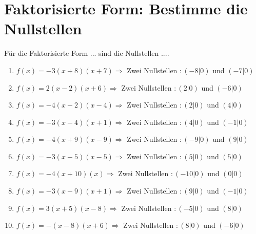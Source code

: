 \documentclass{article}%
\begin{document}
\section{Faktorisierte Form: Bestimme die Nullstellen}%
\label{sec:FaktorisierteFormBestimmedieNullstellen}%
Für die Faktorisierte Form ... sind die Nullstellen ....%
\begin{enumerate}[label=\alph*)]%
\item%
\newline\vspace{0.5cm}$f(x)=-3(x+8)(x+7) \Rightarrow $ Zwei Nullstellen $: (-8|0) $ und $ (-7|0) $%
\item%
\newline\vspace{0.5cm}$f(x)=2(x-2)(x+6) \Rightarrow $ Zwei Nullstellen $: (2|0) $ und $ (-6|0) $%
\item%
\newline\vspace{0.5cm}$f(x)=-4(x-2)(x-4) \Rightarrow $ Zwei Nullstellen $: (2|0) $ und $ (4|0) $%
\item%
\newline\vspace{0.5cm}$f(x)=-3(x-4)(x+1) \Rightarrow $ Zwei Nullstellen $: (4|0) $ und $ (-1|0) $%
\item%
\newline\vspace{0.5cm}$f(x)=-4(x+9)(x-9) \Rightarrow $ Zwei Nullstellen $: (-9|0) $ und $ (9|0) $%
\item%
\newline\vspace{0.5cm}$f(x)=-3(x-5)(x-5) \Rightarrow $ Zwei Nullstellen $: (5|0) $ und $ (5|0) $%
\item%
\newline\vspace{0.5cm}$f(x)=-4(x+10)(x) \Rightarrow $ Zwei Nullstellen $: (-10|0) $ und $ (0|0) $%
\item%
\newline\vspace{0.5cm}$f(x)=-3(x-9)(x+1) \Rightarrow $ Zwei Nullstellen $: (9|0) $ und $ (-1|0) $%
\item%
\newline\vspace{0.5cm}$f(x)=3(x+5)(x-8) \Rightarrow $ Zwei Nullstellen $: (-5|0) $ und $ (8|0) $%
\item%
\newline\vspace{0.5cm}$f(x)=-(x-8)(x+6) \Rightarrow $ Zwei Nullstellen $: (8|0) $ und $ (-6|0) $%

\end{enumerate}
\end{document}
